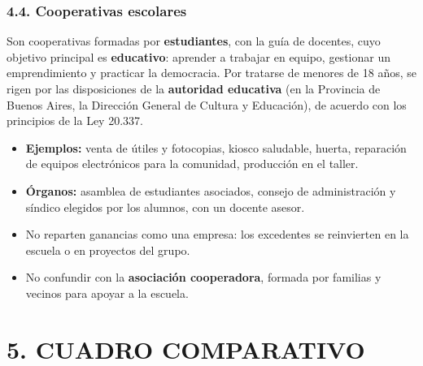 \subsubsection*{4.4. Cooperativas escolares}
Son cooperativas formadas por \textbf{estudiantes}, con la guía de docentes, cuyo objetivo
principal es \textbf{educativo}: aprender a trabajar en equipo, gestionar un emprendimiento y
practicar la democracia. Por tratarse de menores de 18 años, se rigen por las disposiciones de
la \textbf{autoridad educativa} (en la Provincia de Buenos Aires, la Dirección General de
Cultura y Educación), de acuerdo con los principios de la Ley 20.337.

\begin{itemize}
  \item \textbf{Ejemplos:} venta de útiles y fotocopias, kiosco saludable, huerta, reparación de
        equipos electrónicos para la comunidad, producción en el taller.
  \item \textbf{Órganos:} asamblea de estudiantes asociados, consejo de administración y
        síndico elegidos por los alumnos, con un docente asesor.
  \item No reparten ganancias como una empresa: los excedentes se reinvierten en la escuela o
        en proyectos del grupo.
  \item No confundir con la \textbf{asociación cooperadora}, formada por familias y vecinos
        para apoyar a la escuela.
\end{itemize}

\section*{5. CUADRO COMPARATIVO}

